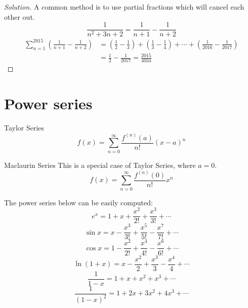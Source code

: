 \begin{proof}[Solution]
A common method is to use partial fractions which will cancel each other out.
\[ \frac{1}{n^2+3n+2} = \frac{1}{n+1}-\frac{1}{n+2} \]
\begin{align*}
\sum_{n=1}^{2015} \left( \frac{1}{n+1}-\frac{1}{n+2} \right)
&= \left(\frac{1}{2}-\frac{1}{3}\right) + \left(\frac{1}{3}-\frac{1}{4}\right) + \cdots + \left(\frac{1}{2016}-\frac{1}{2017}\right) \\
&= \frac{1}{2}-\frac{1}{2017} = \frac{2015}{4034}
\end{align*}
\end{proof}

\section{Power series}
\begin{thrm}{Taylor Series}{} 
\begin{equation} f(x) = \sum_{n=0}^{\infty} \frac{f^{(n)}(a)}{n!} (x-a)^n \end{equation} 
\end{thrm}

\begin{thrm}{Maclaurin Series}{}
This is a special case of Taylor Series, where $a = 0$. 
\begin{equation} f(x) = \sum_{n=0}^{\infty} \frac{f^{(n)}(0)}{n!} x^n \end{equation} \end{thrm}

The power series below can be easily computed:
\begin{equation} e^x = 1 + x + \frac{x^2}{2!} + \frac{x^3}{3!} + \cdots \end{equation}
\begin{equation} \sin x = x - \frac{x^3}{3!} + \frac{x^5}{5!} - \frac{x^7}{7!} + \cdots \end{equation}
\begin{equation} \cos x = 1 - \frac{x^2}{2!} + \frac{x^4}{4!} - \frac{x^6}{6!} + \cdots \end{equation}
\begin{equation} \ln (1+x) = x - \frac{x^2}{2} + \frac{x^3}{3} - \frac{x^4}{4} + \cdots \end{equation}
\begin{equation} \frac{1}{1-x} = 1 + x + x^2 + x^3 + \cdots \end{equation}
\begin{equation} \frac{1}{(1-x)^2} = 1 + 2x + 3x^2 + 4x^3 + \cdots \end{equation}


